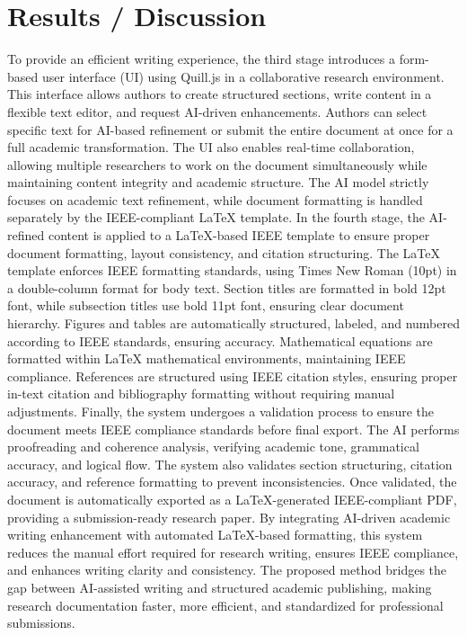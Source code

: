 \documentclass[conference]{IEEEtran}
\begin{document}
  \section{Results / Discussion}
  To provide an efficient writing experience, the third stage introduces a form-based user interface (UI) using Quill.js in a collaborative research environment. This interface allows authors to create structured sections, write content in a flexible text editor, and request AI-driven enhancements. Authors can select specific text for AI-based refinement or submit the entire document at once for a full academic transformation. The UI also enables real-time collaboration, allowing multiple researchers to work on the document simultaneously while maintaining content integrity and academic structure. The AI model strictly focuses on academic text refinement, while document formatting is handled separately by the IEEE-compliant LaTeX template.
In the fourth stage, the AI-refined content is applied to a LaTeX-based IEEE template to ensure proper document formatting, layout consistency, and citation structuring. The LaTeX template enforces IEEE formatting standards, using Times New Roman (10pt) in a double-column format for body text. Section titles are formatted in bold 12pt font, while subsection titles use bold 11pt font, ensuring clear document hierarchy. Figures and tables are automatically structured, labeled, and numbered according to IEEE standards, ensuring accuracy. Mathematical equations are formatted within LaTeX mathematical environments, maintaining IEEE compliance. References are structured using IEEE citation styles, ensuring proper in-text citation and bibliography formatting without requiring manual adjustments.
Finally, the system undergoes a validation process to ensure the document meets IEEE compliance standards before final export. The AI performs proofreading and coherence analysis, verifying academic tone, grammatical accuracy, and logical flow. The system also validates section structuring, citation accuracy, and reference formatting to prevent inconsistencies. Once validated, the document is automatically exported as a LaTeX-generated IEEE-compliant PDF, providing a submission-ready research paper.
By integrating AI-driven academic writing enhancement with automated LaTeX-based formatting, this system reduces the manual effort required for research writing, ensures IEEE compliance, and enhances writing clarity and consistency. The proposed method bridges the gap between AI-assisted writing and structured academic publishing, making research documentation faster, more efficient, and standardized for professional submissions.





  

  

  




\begin{thebibliography}{1}

  
    
  

\end{thebibliography}
\end{document}
